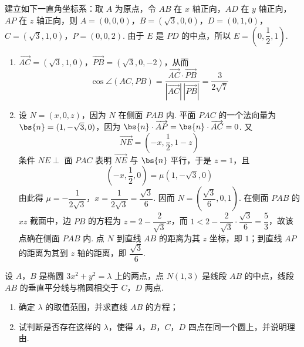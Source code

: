 \begin{solution}
建立如下一直角坐标系：取 \(A\) 为原点，令 \(AB\) 在 \(x\) 轴正向，\(AD\) 在 \(y\) 轴正向，\(AP\) 在 \(z\) 轴正向，则 \(A=(0,0,0)\)，\(B=(\sqrt{3},0,0)\)，\(D=(0,1,0)\)，\(C=(\sqrt{3},1,0)\)，\(P=(0,0,2)\).
由于 \(E\) 是 \(PD\) 的中点，所以 \(E=\left(0,\dfrac12,1\right)\).

\begin{enumerate}
\item \(\overrightarrow{AC}=(\sqrt{3},1,0)\)，\(\overrightarrow{PB}=(\sqrt{3},0,-2)\)，从而
\[
\cos\angle(AC,PB)=\frac{\overrightarrow{AC}\cdot\overrightarrow{PB}}{|\overrightarrow{AC}|\,|\overrightarrow{PB}|}=\frac{3}{2\sqrt{7}}
\]

\item 设 \(N=(x,0,z)\)，因为 \(N\) 在侧面 \(PAB\) 内. 平面 \(PAC\) 的一个法向量为 \(\bs{n}=(1,-\sqrt{3},0)\)，因为 \(\bs{n}\cdot\overrightarrow{AP}=\bs{n}\cdot\overrightarrow{AC}=0\). 又
\[
\overrightarrow{NE}=\left(-x,\frac12,1-z\right)
\]
条件 \(NE\perp\) 面 \(PAC\) 表明 \(\overrightarrow{NE}\) 与 \(\bs{n}\) 平行，于是 \(z=1\)，且
\[
\left(-x,\frac12,0\right)=\mu(1,-\sqrt{3},0)
\]
由此得 \(\mu=-\dfrac{1}{2\sqrt{3}}\)，\(x=\dfrac{1}{2\sqrt{3}}=\dfrac{\sqrt{3}}{6}\). 因而 \(N=\left(\dfrac{\sqrt{3}}{6},0,1\right)\). 在侧面 \(PAB\) 的 \(xz\) 截面中，边 \(PB\) 的方程为 \(z=2-\dfrac{2}{\sqrt{3}}x\)，而 \(1<2-\dfrac{2}{\sqrt{3}}\cdot\dfrac{\sqrt{3}}{6}=\dfrac{5}{3}\)，故该点确在侧面 \(PAB\) 内. 点 \(N\) 到直线 \(AB\) 的距离为其 \(z\) 坐标，即 \(1\)；到直线 \(AP\) 的距离为其到 \(z\) 轴的距离，即 \(\dfrac{\sqrt{3}}{6}\).
\end{enumerate}
\end{solution}

\begin{problem}
设 \(A\)，\(B\) 是椭圆 \(3x^{2} + y^{2} = \lambda\) 上的两点，点 \(N(1,3)\) 是线段 \(AB\) 的中点，线段 \(AB\) 的垂直平分线与椭圆相交于 \(C\)，\(D\) 两点.

\begin{enumerate}
\item 确定 \(\lambda\) 的取值范围，并求直线 \(AB\) 的方程；
\item 试判断是否存在这样的 \(\lambda\)，使得 \(A\)，\(B\)，\(C\)，\(D\) 四点在同一个圆上，并说明理由.
\end{enumerate}
\end{problem}

